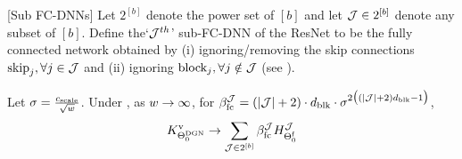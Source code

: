 \begin{definition}\label{def:subfcdnn}[Sub FC-DNNs]
Let $2^{[b]}$ denote the power set of $[b]$ and let $\mathcal{J}\in 2^{[b]}$ denote any subset of $[b]$. Define the`$\mathcal{J}^{th}$' sub-FC-DNN of the ResNet to be the fully connected network obtained by (i) ignoring/removing the skip connections $\text{skip}_j,\forall j\in \mathcal{J}$  and (ii) ignoring $\text{block}_{j},\forall j\notin \mathcal{J}$ (see ).
\end{definition}
\begin{theorem}\label{th:mainres} Let $\sigma=\frac{c_{\text{scale}}}{\sqrt{w}}$. Under , as $w\rightarrow\infty$,  for $\beta_{\text{fc}}^{\mathcal{J}} = (|\mathcal{J}| +2)\cdot d_{\text{blk}}\cdot \sigma^{2\big( (|\mathcal{J}|+2)d_{\text{blk}}-1\big)}$,
\begin{align*}
K^{\text{v}}_{\Theta^{\text{DGN}}_0}\rightarrow \sum_{\mathcal{J}\in 2^{[b]}}  \beta_{\text{fc}}^{\mathcal{J}} H^{\mathcal{J}}_{\Theta^{\textrm{f}}_0}
\end{align*}
\end{theorem}

